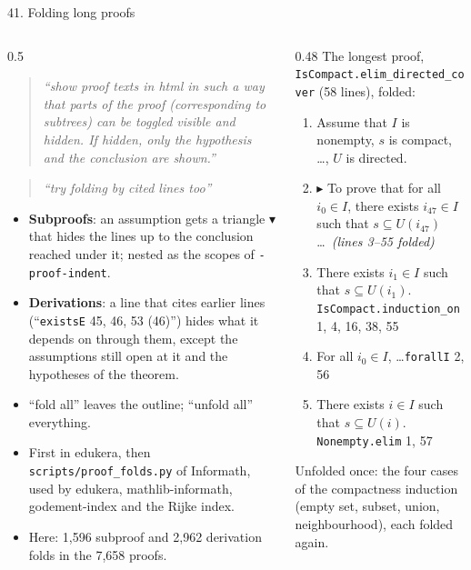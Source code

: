 \documentclass[10pt,aspectratio=169]{beamer}
\newcommand{\ok}[1]{\textcolor{good}{#1}}
\newcommand{\prompt}[1]{\begin{quote}\small\itshape ``#1''\end{quote}}
\begin{document}
\begin{frame}{41. Folding long proofs}
  \scriptsize
  \begin{columns}[T]
    \begin{column}{0.5\textwidth}
      \prompt{show proof texts in html in such a way that parts of the proof (corresponding to
      subtrees) can be toggled visible and hidden. If hidden, only the hypothesis and the
      conclusion are shown.}
      \prompt{try folding by cited lines too}
      \begin{itemize}
        \item \textbf{Subproofs}: an assumption gets a triangle \ok{$\blacktriangledown$} that
              hides the lines up to the conclusion reached under it; nested as the scopes of
              \texttt{-proof-indent}.
        \item \textbf{Derivations}: a line that cites earlier lines (``\texttt{existsE} 45, 46,
              53 (46)'') hides what it depends on through them, except the assumptions
              still open at it and the hypotheses of the theorem.
        \item ``fold all'' leaves the outline; ``unfold all'' everything.
        \item First in edukera, then \texttt{scripts/proof\_folds.py} of Informath, used by
              edukera, mathlib-informath, godement-index and the Rijke index.
        \item Here: \ok{1,596} subproof and \ok{2,962} derivation folds in the 7,658 proofs.
      \end{itemize}
    \end{column}
    \begin{column}{0.48\textwidth}
      The longest proof, \texttt{IsCompact.elim\_directed\_cover} (58 lines), folded:
      \begin{enumerate}\setlength\itemsep{0pt}
        \item[1.] Assume that $I$ is nonempty, $s$ is compact, \ldots, $U$ is directed.
        \item[2.] $\blacktriangleright$ To prove that for all $i_0 \in I$, there exists
              $i_{47} \in I$ such that $s \subseteq U(i_{47})$ \ldots\ \emph{(lines 3--55 folded)}
        \item[56.] There exists $i_1 \in I$ such that $s \subseteq U(i_1)$.
              \hfill\texttt{IsCompact.induction\_on} 1, 4, 16, 38, 55
        \item[57.] For all $i_0 \in I$, \ldots \hfill\texttt{forallI} 2, 56
        \item[58.] There exists $i \in I$ such that $s \subseteq U(i)$.
              \hfill\texttt{Nonempty.elim} 1, 57
      \end{enumerate}
      Unfolded once: the four cases of the compactness induction (empty set, subset, union,
      neighbourhood), each folded again.


\end{column}
\end{columns}
\end{frame}
\end{document}
